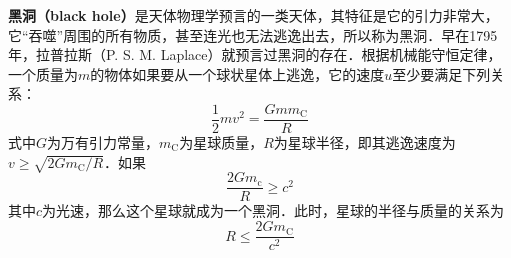 

\textbf{黑洞（black hole）}是天体物理学预言的一类天体，其特征是它的引力非常大，它“吞噬”周围的所有物质，甚至连光也无法逃逸出去，所以称为黑洞．早在1795 年，拉普拉斯（P. S. M. Laplace）就预言过黑洞的存在．根据机械能守恒定律，一个质量为$m$的物体如果要从一个球状星体上逃逸，它的速度$u $至少要满足下列关系：
\begin{equation}
\frac{1}{2} m v^{2}=\frac{G m m_{\mathrm{C}}}{R}
\end{equation}
式中$G $为万有引力常量，$ m_{\mathrm{C}}$为星球质量，$ R $为星球半径，即其逃逸速度为$v \geqslant \sqrt{2 G m_{\mathrm{C}}/R}$．如果
\begin{equation}
\frac{2 G m_{\mathrm{c}}}{R} \geqslant c^{2}
\end{equation}
其中$c$为光速，那么这个星球就成为一个黑洞．此时，星球的半径与质量的关系为
\begin{equation}
R \leqslant \frac{2 G m_{\mathrm{C}}}{c^{2}}
\end{equation}